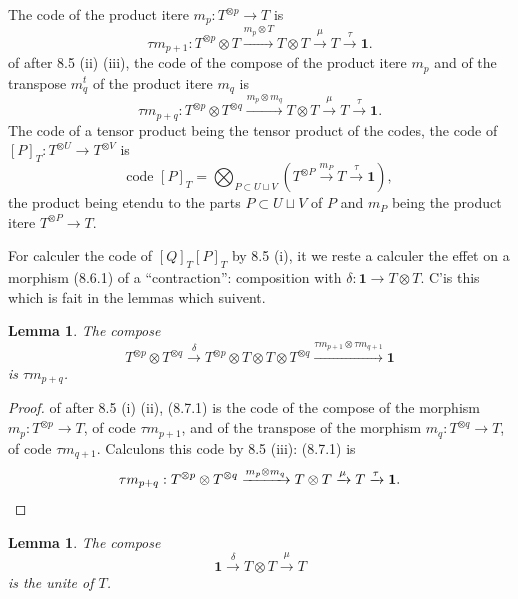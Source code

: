 \documentclass[11pt,a4paper]{article}
\theoremstyle{plain}
\newtheorem{lemma}[theorem]{Lemma}
\theoremstyle{definition}
\begin{document}
The code of the product itere $m_p : T^{\otimes p} \to T$ is
\[
\tau m_{p+1} : T^{\otimes p} \otimes T \xrightarrow{m_p \otimes T} T \otimes T \xrightarrow{\mu} T \xrightarrow{\tau} \mathbf{1}.
\]
of after 8.5 (ii) (iii), the code of the compose of the product itere $m_p$ and of the transpose $m_q^t$ of the product itere $m_q$ is
\[
\tau m_{p+q} : T^{\otimes p} \otimes T^{\otimes q} \xrightarrow{m_p \otimes m_q} T \otimes T \xrightarrow{\mu} T \xrightarrow{\tau} \mathbf{1}.
\]
The code of a tensor product being the tensor product of the codes, the code of $[P]_T : T^{\otimes U} \to T^{\otimes V}$ is
\begin{equation}
\text{code } [P]_T = \bigotimes_{P \subset U \sqcup V} (T^{\otimes P} \xrightarrow{m_P} T \xrightarrow{\tau} \mathbf{1}), \tag{8.6.1}
\end{equation}
the product being etendu to the parts $P \subset U \sqcup V$ of $P$ and $m_P$ being the product itere $T^{\otimes P} \to T$.

For calculer the code of $[Q]_T [P]_T$ by 8.5 (i), it we reste a calculer the effet on a morphism (8.6.1) of a ``contraction'': composition with $\delta : \mathbf{1} \to T \otimes T$. C'is this which is fait in the lemmas which suivent.

\begin{lemma}
The compose
\begin{equation}
T^{\otimes p} \otimes T^{\otimes q} \xrightarrow{\delta} T^{\otimes p} \otimes T \otimes T \otimes T^{\otimes q} \xrightarrow{\tau m_{p+1} \otimes \tau m_{q+1}} \mathbf{1} \tag{8.7.1}
\end{equation}
is $\tau m_{p+q}$.
\end{lemma}

\begin{proof}
of after 8.5 (i) (ii), (8.7.1) is the code of the compose of the morphism $m_p : T^{\otimes p} \to T$, of code $\tau m_{p+1}$, and of the transpose of the morphism $m_q : T^{\otimes q} \to T$, of code $\tau m_{q+1}$. Calculons this code by 8.5 (iii): (8.7.1) is
\[
\tau m_{p+q} : T^{\otimes p} \otimes T^{\otimes q} \xrightarrow{m_p \otimes m_q} T \otimes T \xrightarrow{\mu} T \xrightarrow{\tau} \mathbf{1}. \qedhere
\]
\end{proof}

\begin{lemma}
The compose
\[
\mathbf{1} \xrightarrow{\delta} T \otimes T \xrightarrow{\mu} T
\]
is the unite of $T$.
\end{lemma}
\end{document}

